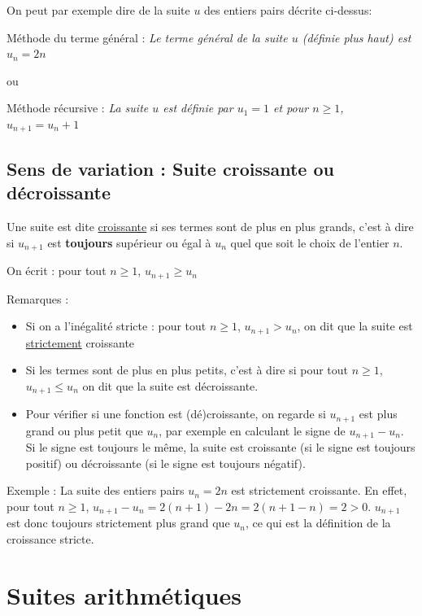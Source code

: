 \documentclass[10pt,a4paper]{book}
\begin{document}
    On peut par exemple dire de la suite $u$ des entiers pairs décrite ci-dessus:
    
      {
      \centering
      Méthode du terme général : \textit{Le terme général de la suite $u$ (définie plus haut) est $u_n=2n$}
      \par

ou
    
      Méthode récursive : \textit{La suite $u$ est définie par $u_1=1$ et pour $n\geq1$, $u_{n+1}=u_n+1$}\par
      }

\subsection{Sens de variation : Suite croissante ou décroissante}

\begin{de}[Rappel]
Une suite est dite \underline{croissante} si ses termes sont de plus en plus grands, c'est à dire si $u_{n+1}$ est \textbf{toujours} supérieur ou égal à $u_n$ quel que soit le choix de l'entier $n$.

On écrit : pour tout $n \geq 1$, $u_{n+1} \geq u_n$
\end{de}

Remarques :
\begin{itemize}
    \item Si on a l'inégalité stricte : pour tout $n \geq 1$, $u_{n+1} > u_n$, on dit que la suite est \underline{strictement} croissante
    \item Si les termes sont de plus en plus petits, c'est à dire si pour tout $n \geq 1$, $u_{n+1} \leq u_n$  on dit que la suite est décroissante.
    \item Pour vérifier si une fonction est (dé)croissante, on regarde si $u_{n+1}$ est plus grand ou plus petit que $u_n$, par exemple en calculant le signe de $u_{n+1} - u_n$. Si le signe est toujours le même, la suite est croissante (si le signe est toujours positif) ou décroissante (si le signe est toujours négatif).
\end{itemize}


Exemple : La suite des entiers pairs $u_n=2n$ est strictement croissante. En effet, pour tout $n \geq 1$, $u_{n+1} - u_n = 2(n+1) - 2n= 2 (n+1-n) = 2 > 0$. $u_{n+1}$ est donc toujours strictement plus grand que $u_n$, ce qui est la définition de la croissance stricte.



\section{Suites arithmétiques}
\end{document}
